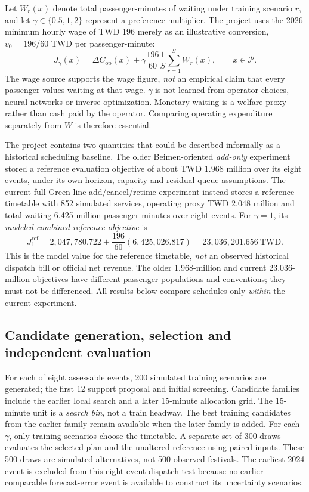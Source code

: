 Let $W_r(x)$ denote total passenger-minutes of waiting under training scenario $r$, and let $\gamma\in\{0.5,1,2\}$ represent a preference multiplier. The project uses the 2026 minimum hourly wage of TWD 196 \cite{wage} merely as an illustrative conversion, $v_0=196/60$ TWD per passenger-minute:
\begin{equation}
J_\gamma(x)=\Delta C_{\mathrm{op}}(x)
+\gamma\frac{196}{60}\frac1S\sum_{r=1}^{S}W_r(x),
\qquad x\in\mathcal P.
\label{eq:objective}
\end{equation}
The wage source supports the wage figure, \emph{not} an empirical claim that every passenger values waiting at that wage. $\gamma$ is not learned from operator choices, neural networks or inverse optimization. Monetary waiting is a welfare proxy rather than cash paid by the operator. Comparing operating expenditure separately from $W$ is therefore essential.

The project contains two quantities that could be described informally as a historical scheduling baseline. The older Beimen-oriented \emph{add-only} experiment stored a reference evaluation objective of about TWD 1.968 million over its eight events, under its own horizon, capacity and residual-queue assumptions. The current full Green-line add/cancel/retime experiment instead stores a reference timetable with 852 simulated services, operating proxy TWD 2.048 million and total waiting 6.425 million passenger-minutes over eight events. For $\gamma=1$, its \emph{modeled combined reference objective} is
\begin{equation}
J_1^{\mathrm{ref}}=
2{,}047{,}780.722+\frac{196}{60}(6{,}425{,}026.817)
=23{,}036{,}201.656\ \text{TWD}.
\label{eq:referenceobjective}
\end{equation}
This is the model value for the reference timetable, \emph{not} an observed historical dispatch bill or official net revenue. The older 1.968-million and current 23.036-million objectives have different passenger populations and conventions; they must not be differenced. All results below compare schedules only \emph{within} the current experiment.

\subsection{Candidate generation, selection and independent evaluation}
For each of eight assessable events, 200 simulated training scenarios are generated; the first 12 support proposal and initial screening. Candidate families include the earlier local search and a later 15-minute allocation grid. The 15-minute unit is a \emph{search bin}, not a train headway. The best training candidates from the earlier family remain available when the later family is added. For each $\gamma$, only training scenarios choose the timetable. A separate set of 300 draws evaluates the selected plan and the unaltered reference using paired inputs. These 500 draws are simulated alternatives, not 500 observed festivals. The earliest 2024 event is excluded from this eight-event dispatch test because no earlier comparable forecast-error event is available to construct its uncertainty scenarios.


